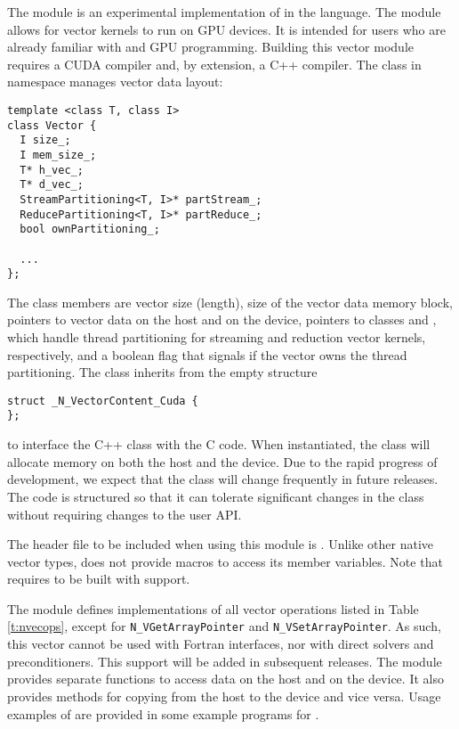 %
The {\nveccuda} module is an experimental implementation of {\nvector} in the {\cuda} language. 
The module allows for {\sundials} vector kernels to run on GPU devices. It is intended for users 
who are already familiar with {\cuda} and GPU programming. Building this vector 
module requires a CUDA compiler and, by extension, a C++ compiler. The class  
in namespace  manages vector data layout: 
\begin{verbatim} 
template <class T, class I>
class Vector {
  I size_;
  I mem_size_;
  T* h_vec_;
  T* d_vec_;
  StreamPartitioning<T, I>* partStream_;
  ReducePartitioning<T, I>* partReduce_;
  bool ownPartitioning_;
  
  ...
};
\end{verbatim}

The class members are vector size (length), size of the vector data memory block, pointers
to vector data on the host and on the device, pointers to classes 
and , which handle thread partitioning for streaming and 
reduction vector kernels, respectively, and a boolean flag that signals if the
vector owns the thread partitioning. The class  inherits from the empty structure
\begin{verbatim} 
struct _N_VectorContent_Cuda {
};
\end{verbatim}
to interface the C++ class with the {\nvector} C code. When instantiated, the class
 will allocate memory on both the host and the device. Due to the rapid
progress of {\cuda} development, we expect that the 
class will change frequently in future {\sundials} releases. The code is
structured so that it can tolerate significant changes in the 
 class without requiring changes to the user API.


The header file to be included when using this module is .
Unlike other native {\sundials} vector types, {\nveccuda} does not provide macros 
to access its member variables.
Note that {\nveccuda} requires {\sundials} to be built with {\mpi} support.


The {\nveccuda} module defines implementations of all vector operations listed 
in Table \ref{t:nvecops}, except for \verb|N_VGetArrayPointer| and 
\verb|N_VSetArrayPointer|. 
As such, this vector cannot be used with {\sundials} Fortran interfaces,
nor with {\sundials} direct solvers and preconditioners. This support
will be added in subsequent {\sundials} releases. 
The {\nveccuda} module provides separate functions to access data on the host
and on the device. It also provides methods for copying from the host to 
the device and vice versa. Usage examples of {\nveccuda} are provided in
some example programs for {\cvode} \cite{cvode_ex}.

